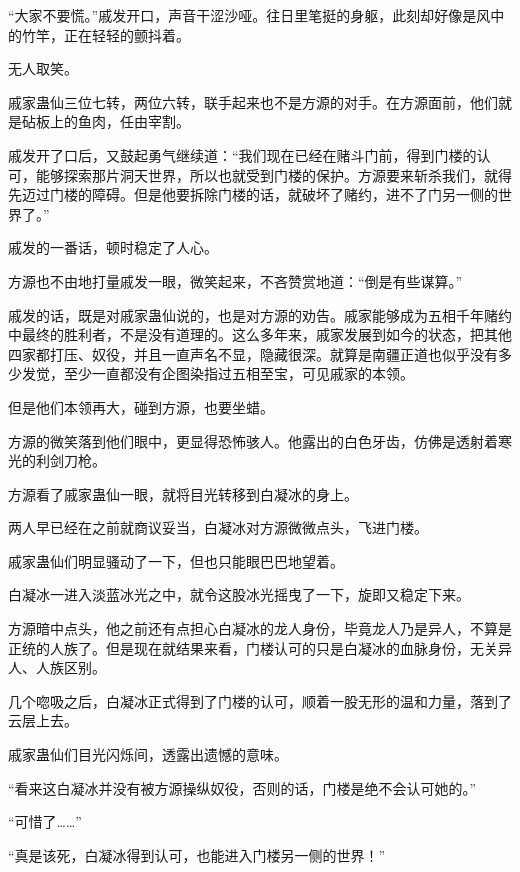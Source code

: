 
\begin{this_body}

“大家不要慌。”戚发开口，声音干涩沙哑。往日里笔挺的身躯，此刻却好像是风中的竹竿，正在轻轻的颤抖着。

无人取笑。

戚家蛊仙三位七转，两位六转，联手起来也不是方源的对手。在方源面前，他们就是砧板上的鱼肉，任由宰割。

戚发开了口后，又鼓起勇气继续道：“我们现在已经在赌斗门前，得到门楼的认可，能够探索那片洞天世界，所以也就受到门楼的保护。方源要来斩杀我们，就得先迈过门楼的障碍。但是他要拆除门楼的话，就破坏了赌约，进不了门另一侧的世界了。”

戚发的一番话，顿时稳定了人心。

方源也不由地打量戚发一眼，微笑起来，不吝赞赏地道：“倒是有些谋算。”

戚发的话，既是对戚家蛊仙说的，也是对方源的劝告。戚家能够成为五相千年赌约中最终的胜利者，不是没有道理的。这么多年来，戚家发展到如今的状态，把其他四家都打压、奴役，并且一直声名不显，隐藏很深。就算是南疆正道也似乎没有多少发觉，至少一直都没有企图染指过五相至宝，可见戚家的本领。

但是他们本领再大，碰到方源，也要坐蜡。

方源的微笑落到他们眼中，更显得恐怖骇人。他露出的白色牙齿，仿佛是透射着寒光的利剑刀枪。

方源看了戚家蛊仙一眼，就将目光转移到白凝冰的身上。

两人早已经在之前就商议妥当，白凝冰对方源微微点头，飞进门楼。

戚家蛊仙们明显骚动了一下，但也只能眼巴巴地望着。

白凝冰一进入淡蓝冰光之中，就令这股冰光摇曳了一下，旋即又稳定下来。

方源暗中点头，他之前还有点担心白凝冰的龙人身份，毕竟龙人乃是异人，不算是正统的人族了。但是现在就结果来看，门楼认可的只是白凝冰的血脉身份，无关异人、人族区别。

几个唿吸之后，白凝冰正式得到了门楼的认可，顺着一股无形的温和力量，落到了云层上去。

戚家蛊仙们目光闪烁间，透露出遗憾的意味。

“看来这白凝冰并没有被方源操纵奴役，否则的话，门楼是绝不会认可她的。”

“可惜了……”

“真是该死，白凝冰得到认可，也能进入门楼另一侧的世界！”


\end{this_body}
